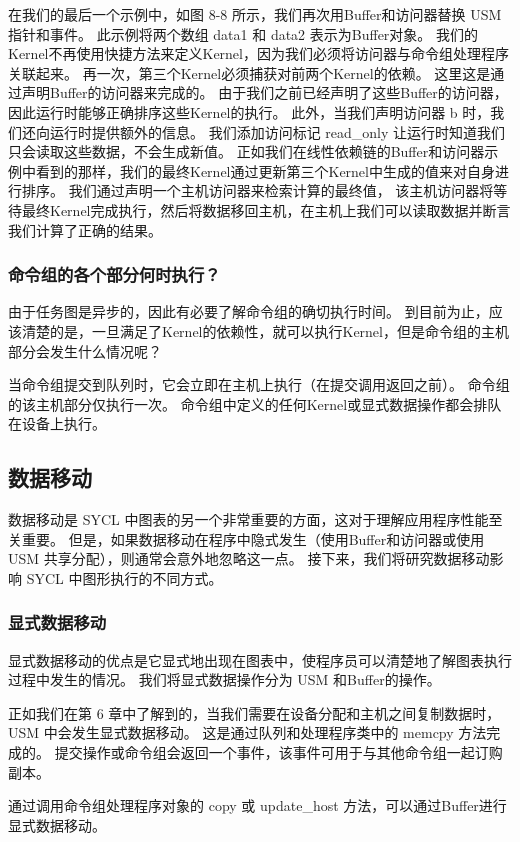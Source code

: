 在我们的最后一个示例中，如图 8-8 所示，我们再次用Buffer和访问器替换 USM 指针和事件。 
此示例将两个数组 data1 和 data2 表示为Buffer对象。 
我们的Kernel不再使用快捷方法来定义Kernel，因为我们必须将访问器与命令组处理程序关联起来。 
再一次，第三个Kernel必须捕获对前两个Kernel的依赖。 这里这是通过声明Buffer的访问器来完成的。 
由于我们之前已经声明了这些Buffer的访问器，因此运行时能够正确排序这些Kernel的执行。 
此外，当我们声明访问器 b 时，我们还向运行时提供额外的信息。 
我们添加访问标记 read\_only 让运行时知道我们只会读取这些数据，不会生成新值。 
正如我们在线性依赖链的Buffer和访问器示例中看到的那样，我们的最终Kernel通过更新第三个Kernel中生成的值来对自身进行排序。 
我们通过声明一个主机访问器来检索计算的最终值，
该主机访问器将等待最终Kernel完成执行，然后将数据移回主机，在主机上我们可以读取数据并断言我们计算了正确的结果。

\subsubsection{命令组的各个部分何时执行？}
由于任务图是异步的，因此有必要了解命令组的确切执行时间。 
到目前为止，应该清楚的是，一旦满足了Kernel的依赖性，就可以执行Kernel，但是命令组的主机部分会发生什么情况呢？

当命令组提交到队列时，它会立即在主机上执行（在提交调用返回之前）。 
命令组的该主机部分仅执行一次。 命令组中定义的任何Kernel或显式数据操作都会排队在设备上执行。

\subsection{数据移动}
数据移动是 SYCL 中图表的另一个非常重要的方面，这对于理解应用程序性能至关重要。 
但是，如果数据移动在程序中隐式发生（使用Buffer和访问器或使用 USM 共享分配），则通常会意外地忽略这一点。 
接下来，我们将研究数据移动影响 SYCL 中图形执行的不同方式。

\subsubsection{显式数据移动}
显式数据移动的优点是它显式地出现在图表中，使程序员可以清楚地了解图表执行过程中发生的情况。 
我们将显式数据操作分为 USM 和Buffer的操作。

正如我们在第 6 章中了解到的，当我们需要在设备分配和主机之间复制数据时，USM 中会发生显式数据移动。 
这是通过队列和处理程序类中的 memcpy 方法完成的。 
提交操作或命令组会返回一个事件，该事件可用于与其他命令组一起订购副本。

通过调用命令组处理程序对象的 copy 或 update\_host 方法，可以通过Buffer进行显式数据移动。

